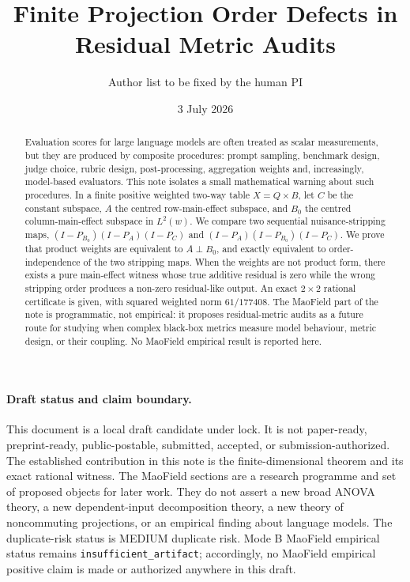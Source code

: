 \documentclass[11pt]{article}
\title{Finite Projection Order Defects in Residual Metric Audits}
\author{Author list to be fixed by the human PI}
\affil{MaoField research programme; local draft candidate under lock}
\date{3 July 2026}
\theoremstyle{remark}
\begin{document}
\maketitle

\begin{abstract}
Evaluation scores for large language models are often treated as scalar measurements, but they are produced by composite procedures: prompt sampling, benchmark design, judge choice, rubric design, post-processing, aggregation weights and, increasingly, model-based evaluators. This note isolates a small mathematical warning about such procedures. In a finite positive weighted two-way table $X=Q\times B$, let $C$ be the constant subspace, $A$ the centred row-main-effect subspace, and $B_0$ the centred column-main-effect subspace in $L^2(w)$. We compare two sequential nuisance-stripping maps, $(I-P_{B_0})(I-P_A)(I-P_C)$ and $(I-P_A)(I-P_{B_0})(I-P_C)$. We prove that product weights are equivalent to $A\perp B_0$, and exactly equivalent to order-independence of the two stripping maps. When the weights are not product form, there exists a pure main-effect witness whose true additive residual is zero while the wrong stripping order produces a non-zero residual-like output. An exact $2\times2$ rational certificate is given, with squared weighted norm $61/177408$. The MaoField part of the note is programmatic, not empirical: it proposes residual-metric audits as a future route for studying when complex black-box metrics measure model behaviour, metric design, or their coupling. No MaoField empirical result is reported here.
\end{abstract}

\paragraph{Draft status and claim boundary.}
This document is a local draft candidate under lock. It is not paper-ready,
preprint-ready, public-postable, submitted, accepted, or submission-authorized.
The established contribution in this note is the finite-dimensional theorem and its exact rational witness. The MaoField sections are a research programme and set of proposed objects for later work. They do not assert a new broad ANOVA theory, a new dependent-input decomposition theory, a new theory of noncommuting projections, or an empirical finding about language models.
The duplicate-risk status is MEDIUM duplicate risk.
Mode B MaoField empirical status remains \texttt{insufficient_artifact}; accordingly, no MaoField empirical positive claim is made or authorized anywhere in this draft.
\end{document}
